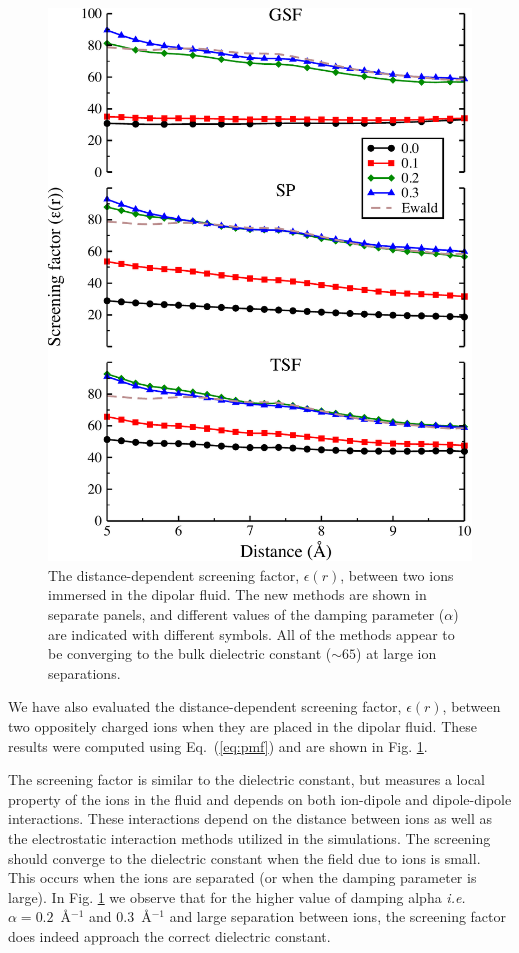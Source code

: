 \begin{figure}
\begin{center}
\includegraphics[width=4.5in]{ScreeningFactor_Dipole.pdf}
\caption{The distance-dependent screening factor, $\epsilon(r)$,
  between two ions immersed in the dipolar fluid. The new methods are
  shown in separate panels, and different values of the damping
  parameter ($\alpha$) are indicated with different symbols. All of
  the methods appear to be converging to the bulk dielectric constant
  ($\sim 65$) at large ion separations.}
\label{fig:ScreeningFactor_Dipole}
\end{center}
\end{figure}
We have also evaluated the distance-dependent screening factor,
$\epsilon(r)$, between two oppositely charged ions when they are
placed in the dipolar fluid.  These results were computed using
Eq.~(\ref{eq:pmf}) and are shown in Fig.
\ref{fig:ScreeningFactor_Dipole}.

The screening factor is similar to the dielectric constant, but
measures a local property of the ions in the fluid and depends on both
ion-dipole and dipole-dipole interactions. These interactions depend
on the distance between ions as well as the electrostatic interaction
methods utilized in the simulations. The screening should converge to
the dielectric constant when the field due to ions is small. This
occurs when the ions are separated (or when the damping parameter is
large). In Fig. \ref{fig:ScreeningFactor_Dipole} we observe that for
the higher value of damping alpha \textit{i.e.}
$\alpha = 0.2$~\AA$^{-1}$ and $0.3$~\AA$^{-1}$ and large separation
between ions, the screening factor does indeed approach the correct
dielectric constant.

